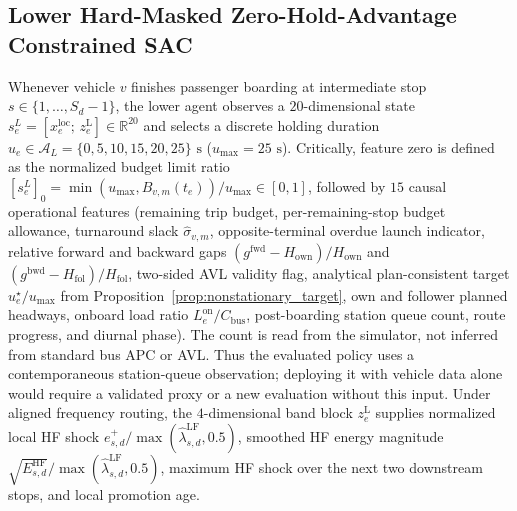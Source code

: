 \subsection{Lower Hard-Masked Zero-Hold-Advantage Constrained SAC}
\label{sec:method_lower}

Whenever vehicle $v$ finishes passenger boarding at intermediate stop $s \in \{1, \dots, S_d-1\}$, the lower agent observes a $20$-dimensional state $s^L_e = [x^{\mathrm{loc}}_e;\, z^{\mathrm{L}}_e] \in \mathbb{R}^{20}$ and selects a discrete holding duration $u_e \in \mathcal{A}_L = \{0, 5, 10, 15, 20, 25\}\text{ s}$ ($u_{\max} = 25\text{ s}$). Critically, feature zero is defined as the normalized budget limit ratio $[s^L_e]_0 = \min(u_{\max}, B_{v,m}(t_e)) / u_{\max} \in [0, 1]$, followed by $15$ causal operational features (remaining trip budget, per-remaining-stop budget allowance, turnaround slack $\hat{\sigma}_{v,m}$, opposite-terminal overdue launch indicator, relative forward and backward gaps $(g^{\mathrm{fwd}} - H_{\mathrm{own}})/H_{\mathrm{own}}$ and $(g^{\mathrm{bwd}} - H_{\mathrm{fol}})/H_{\mathrm{fol}}$, two-sided AVL validity flag, analytical plan-consistent target $u^\star_e / u_{\max}$ from Proposition~\ref{prop:nonstationary_target}, own and follower planned headways, onboard load ratio $L^{\mathrm{on}}_e/C_{\mathrm{bus}}$, post-boarding station queue count, route progress, and diurnal phase). The count is read from the simulator, not inferred from standard bus APC or AVL. Thus the evaluated policy uses a contemporaneous station-queue observation; deploying it with vehicle data alone would require a validated proxy or a new evaluation without this input. Under aligned frequency routing, the $4$-dimensional band block $z^{\mathrm{L}}_e$ supplies normalized local HF shock $e^{+}_{s,d}/\max(\hat{\lambda}^{\mathrm{LF}}_{s,d}, 0.5)$, smoothed HF energy magnitude $\sqrt{E^{\mathrm{HF}}_{s,d}}/\max(\hat{\lambda}^{\mathrm{LF}}_{s,d}, 0.5)$, maximum HF shock over the next two downstream stops, and local promotion age.

